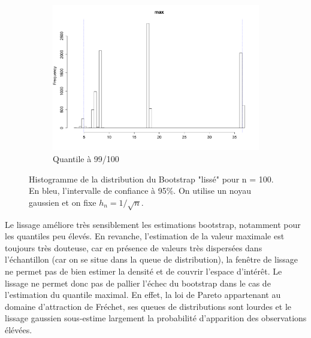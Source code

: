 \documentclass{article}
\renewcommand*{\(}{ \left( }
\renewcommand*{\)}{ \right) }
\begin{document}
\begin{figure}[H]
\begin{subfigure}[t]{0.3\textwidth}
        \includegraphics[width = \linewidth]{img/BootstrapSmooth-Max-100.pdf}
        \caption{Quantile à 99/100}
        \label{fig:smoothBMax}
    \end{subfigure}%
    \caption{Histogramme de la distribution du Bootstrap "lissé" pour n = 100. En bleu, l'intervalle de confiance à 95\%. On utilise un noyau gaussien et on fixe $h_n =1/\sqrt{n}$.}
    \label{fig:smoothB}
\end{figure}

Le lissage améliore très sensiblement les estimations bootstrap, notamment pour les quantiles peu élevés. En revanche, l'estimation de la valeur maximale est toujours très douteuse, car en présence de valeurs très dispersées dans l'échantillon (car on se situe dans la queue de distribution), la fenêtre de lissage ne permet pas de bien estimer la densité et de couvrir l'espace d'intérêt. Le lissage ne permet donc pas de pallier l'échec du bootstrap dans le cas de l'estimation du quantile maximal. En effet, la loi de Pareto appartenant au domaine d'attraction de Fréchet, ses queues de distributions sont lourdes et le lissage gaussien sous-estime largement la probabilité d'apparition des observations élévées.
\end{document}
